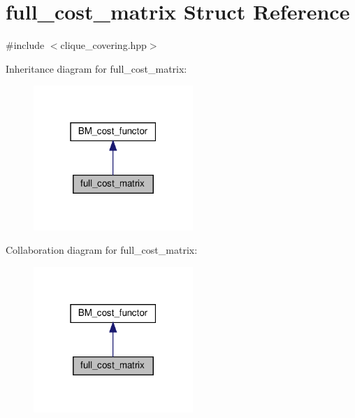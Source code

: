 \hypertarget{structfull__cost__matrix}{}\section{full\+\_\+cost\+\_\+matrix Struct Reference}
\label{structfull__cost__matrix}


{\ttfamily \#include $<$clique\+\_\+covering.\+hpp$>$}



Inheritance diagram for full\+\_\+cost\+\_\+matrix\+:
\nopagebreak
\begin{figure}[H]
\begin{center}
\leavevmode
\includegraphics[width=171pt]{d8/d3c/structfull__cost__matrix__inherit__graph}
\end{center}
\end{figure}


Collaboration diagram for full\+\_\+cost\+\_\+matrix\+:
\nopagebreak
\begin{figure}[H]
\begin{center}
\leavevmode
\includegraphics[width=171pt]{df/dde/structfull__cost__matrix__coll__graph}
\end{center}
\end{figure}
